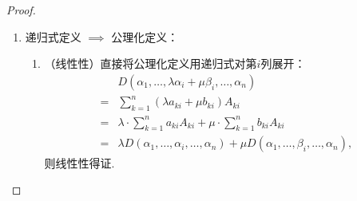 \begin{proof}
\begin{enumerate}
        \item 递归式定义 $\implies$ 公理化定义：
            \begin{enumerate}
                \item （线性性）直接将公理化定义用递归式对第$i$列展开：
                    \begin{align*}
                            & D(\alpha_1,\ldots,\lambda\alpha_{i}+\mu\beta_i,\ldots,\alpha_n)                                      \\
                        ={} & \sum_{k=1}^{n}(\lambda a_{ki}+\mu b_{ki})A_{ki}                                                      \\
                        ={} & \lambda \cdot \sum_{k=1}^{n}a_{ki}A_{ki}+\mu \cdot \sum_{k=1}^{n}b_{ki}A_{ki}                        \\
                        ={} & \lambda D(\alpha_1,\ldots,\alpha_{i},\ldots,\alpha_n)+\mu D(\alpha_1,\ldots,\beta_i,\ldots,\alpha_n),
                    \end{align*}
                    则线性性得证.


\end{enumerate}
\end{enumerate}
\end{proof}

